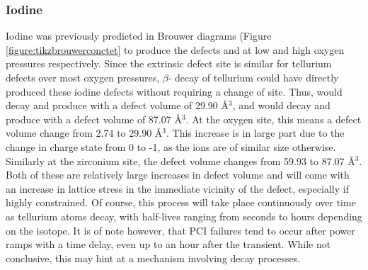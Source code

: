 \documentclass[11pt,a4paper]{article}
\begin{document}
\subsubsection*{Iodine}

Iodine was previously predicted in Brouwer diagrams (Figure \ref{figure:tikzbrouwerconctet} to produce the defects  and  at low and high oxygen pressures respectively. Since the extrinsic defect site is similar for tellurium defects over most oxygen pressures, $\beta$- decay of tellurium could have directly produced these iodine defects without requiring a change of site. Thus,  would decay and produce  with a defect volume of 29.90 \r{A}$^{3}$, and  would decay and produce  with a defect volume of 87.07 \r{A}$^{3}$. At the oxygen site, this means a defect volume change from 2.74 to 29.90 \r{A}$^{3}$. This increase is in large part due to the change in charge state from 0 to -1, as the ions are of similar size otherwise. \\ 

Similarly at the zirconium site, the defect volume changes from 59.93 to 87.07 \r{A}$^{3}$. Both of these are relatively large increases in defect volume and will come with an increase in lattice stress in the immediate vicinity of the defect, especially if highly constrained. Of course, this  process will take place continuously over time as tellurium atoms decay, with half-lives ranging from seconds to hours depending on the isotope. It is of note however, that PCI failures tend to occur after power ramps with a time delay, even up to an hour after the transient. While not conclusive, this may hint at a mechanism involving decay processes. 

\end{document}
